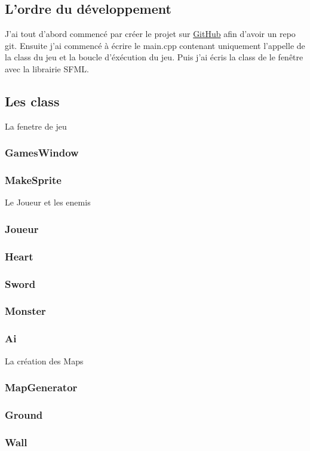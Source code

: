 \documentclass[a4paper,12pt]{article} %
\begin{document}
\subsection{L'ordre du développement}

J'ai tout d'abord commencé par créer le projet sur \underline{GitHub} afin d'avoir un repo git.
Ensuite j'ai commencé à écrire le main.cpp contenant uniquement l'appelle de la class du jeu et la boucle d'éxécution du jeu.
Puis j'ai écris la class de le fenêtre avec la librairie SFML.

\subsection{Les class}

La fenetre de jeu

\subsubsection{GamesWindow}

\subsubsection{MakeSprite}

Le Joueur et les enemis

\subsubsection{Joueur}

\subsubsection{Heart}

\subsubsection{Sword}

\subsubsection{Monster}

\subsubsection{Ai}

La création des Maps

\subsubsection{MapGenerator}

\subsubsection{Ground}

\subsubsection{Wall}
\end{document}
